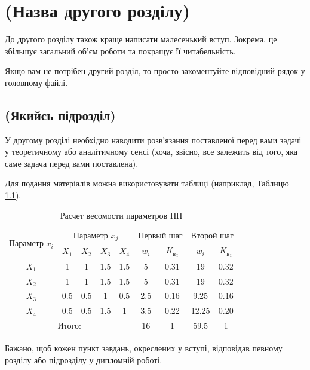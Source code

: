 \chapter{(Назва другого розділу)}
\label{chap:theory}

До другого розділу також краще написати малесенький вступ. Зокрема, це 
збільшує загальний об'єм роботи та покращує її читабельність.

Якщо вам не потрібен другий розділ, то просто закоментуйте відповідний 
рядок у головному файлі.

\section{(Якийсь підрозділ)}

У другому розділі необхідно наводити розв'язання поставленої перед вами 
задачі у теоретичному або аналітичному сенсі (хоча, звісно, все залежить 
від того, яка саме задача перед вами поставлена).

Для подання матеріалів можна використовувати таблиці (наприклад, 
Таблицю \ref{tab_weight}).

    \begin{table}[ht]
    \setfontsize{14pt}
    \caption{Расчет весомости параметров ПП}
    \label{tab_weight}
    \centering
        \begin{tabular}{|c|c|c|c|c|c|c|c|c|}
        \hline \multirow{2}{*}{Параметр $x_i$} & \multicolumn{4}{c|}{Параметр $x_j$} & 
            \multicolumn{2}{c|}{Первый шаг} & \multicolumn{2}{c|}{Второй шаг} \\
        \cline{2-9} & $X_1$ & $X_2$ & $X_3$ & $X_4$ & $w_i$ & 
            ${K_\text{в}}_i$ & $w_i$ & ${K_\text{в}}_i$ \\
        \hline $X_1$ & 1 & 1 & 1.5 & 1.5 & 5 & 0.31 & 19 & 0.32 \\
        \hline $X_2$ & 1 & 1 & 1.5 & 1.5 & 5 & 0.31 & 19 & 0.32 \\
        \hline $X_3$ & 0.5 & 0.5 & 1 & 0.5 & 2.5 & 0.16 & 9.25 & 0.16 \\
        \hline $X_4$ & 0.5 & 0.5 & 1.5 & 1 & 3.5 & 0.22 & 12.25 & 0.20 \\
        \hline \multicolumn{5}{|c|}{Итого:} & 16 & 1 & 59.5 & 1 \\
        \hline
        \end{tabular}
    \end{table}

Бажано, щоб кожен пункт завдань, окреслених у вступі, відповідав певному 
розділу або підрозділу у дипломній роботі.

